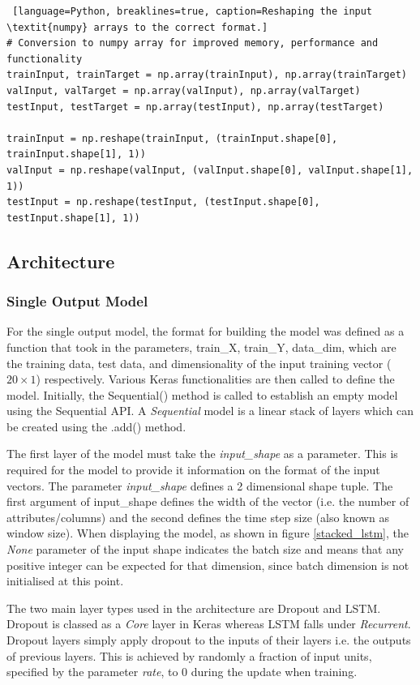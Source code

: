 \documentclass[10pt,onecolumn,letterpaper]{article}
\begin{document}
\begin{lstlisting} [language=Python, breaklines=true, caption=Reshaping the input \textit{numpy} arrays to the correct format.]
# Conversion to numpy array for improved memory, performance and functionality
trainInput, trainTarget = np.array(trainInput), np.array(trainTarget)
valInput, valTarget = np.array(valInput), np.array(valTarget)
testInput, testTarget = np.array(testInput), np.array(testTarget)

trainInput = np.reshape(trainInput, (trainInput.shape[0], trainInput.shape[1], 1))
valInput = np.reshape(valInput, (valInput.shape[0], valInput.shape[1], 1))
testInput = np.reshape(testInput, (testInput.shape[0], testInput.shape[1], 1))
\end{lstlisting} 

\subsection{Architecture} 
\subsubsection{Single Output Model}

For the single output model, the format for building the model was defined as a function that took in the parameters, train\_X, train\_Y, data\_dim, which are the training data, test data, and dimensionality of the input training vector ($20\times1$) respectively. Various Keras functionalities are then called to define the model. Initially, the Sequential() method is called to establish an empty model using the Sequential API. A \textit{Sequential} model is a linear stack of layers which can be created using the .add() method. 

The first layer of the model must take the \textit{input\_shape} as a parameter. This is required for the model to provide it information on the format of the input vectors. The parameter \textit{input\_shape} defines a 2 dimensional shape tuple. The first argument of input\_shape defines the width of the vector (i.e. the number of attributes/columns) and the second defines the time step size (also known as window size). When displaying the model, as shown in figure \ref{stacked_lstm}, the \textit{None} parameter of the input shape indicates the batch size and means that any positive integer can be expected for that dimension, since batch dimension is not initialised at this point. 

The two main layer types used in the architecture are Dropout and LSTM. Dropout is classed as a \textit{Core} layer in Keras whereas LSTM falls under \textit{Recurrent}. Dropout layers simply apply dropout to the inputs of their layers i.e. the outputs of previous layers. This is achieved by randomly a fraction of input units, specified by the parameter \textit{rate}, to 0 during the update when training. 
\end{document}
